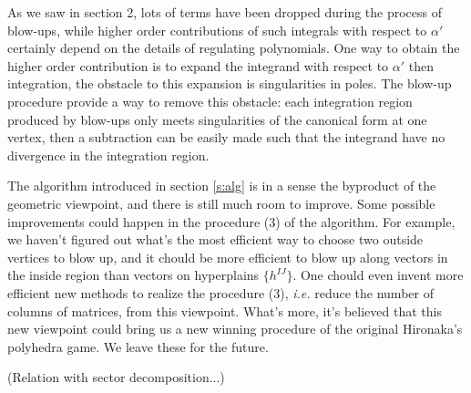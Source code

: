 \documentclass[12pt]{article}
\theoremstyle{definition}
\theoremstyle{plain}
\newcommand{\dif}{\mathrm{d}} %
\begin{document}
As we saw in section 2, lots of terms have been dropped during the process of blow-ups, while higher order contributions of such integrals with respect to $\alpha'$ certainly depend on the details of regulating polynomials. One way to obtain the higher order contribution is to expand the integrand with respect to $\alpha'$ then integration, the obstacle to this expansion is singularities in poles. The blow-up procedure provide a way to remove this obstacle: each integration region produced by blow-ups only meets singularities of the canonical form at one vertex, then a subtraction can be easily made such that the integrand have no divergence in the integration region.

The algorithm introduced in section \ref{s:alg} is in a sense 
the byproduct of the geometric viewpoint, and there is still much room to improve.
Some possible improvements could happen in the procedure (3) of the algorithm. 
For example, we haven't figured out what's the most efficient way to choose 
two outside vertices to blow up, 
and it chould be more efficient to blow up along vectors in the inside region than
vectors on hyperplains $\{h^{IJ}\}$. One chould even invent more efficient new methods 
to realize the procedure (3), \textit{i.e.} reduce the number of columns of matrices, 
from this viewpoint. What's more, it's believed that this new viewpoint could bring
us a new winning procedure of the original Hironaka's polyhedra game. 
We leave these for the future.

(Relation with sector decomposition...)



\end{document}
